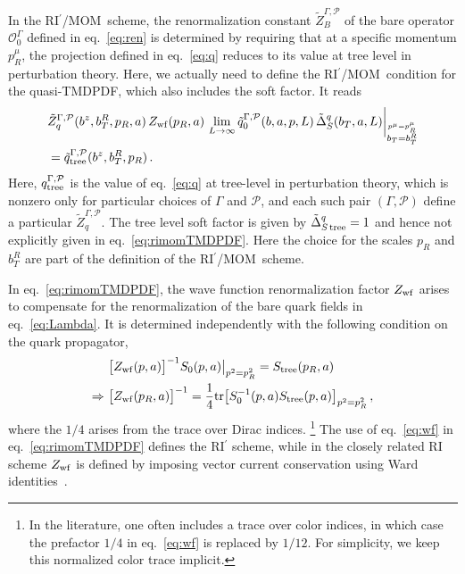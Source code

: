 \documentclass[11pt,a4paper]{article}
\DeclareRobustCommand{\eq}[1]{eq.~\eqref{eq:#1}}
\newcommand{\cO}{\mathcal{O}}
\newcommand{\cP}{\mathcal{P}}
\newcommand{\nn}{\nonumber}
\newcommand{\RIpMOM}{RI$^\prime$/MOM}
\begin{document}
In the \RIpMOM~scheme, the renormalization constant $\tilde Z_B^{\Gamma,\cP}$ of the
bare operator $\cO_0^\Gamma$ defined in \eq{ren} is determined by requiring that at
a specific momentum $p_R^\mu$, the projection defined in \eq{q} reduces to its value
at tree level in perturbation theory.
Here, we actually need to define the \RIpMOM\ condition for the quasi-TMDPDF, which also includes the soft factor. It reads
\begin{align}\label{eq:rimomTMDPDF}
 &\tilde Z^{\Gamma,\cP}_q(b^z, b_T^R, p_R, a) \, Z_{\rm wf}(p_R,a) \,
 \lim_{L\to\infty}  \tilde q^{\Gamma,\cP}_0(b, a, p, L) \, \tilde\Delta_S^q(b_T,a,L) \bigg|_{\stackrel{p^\mu = p_R^\mu}{b_T=b_T^R}}
\nn\\&
 = \tilde{q}^{\Gamma,\cP}_{\rm tree}(b^z,b_T^R,p_R)
\,.\end{align}
Here, $q^{\Gamma,\cP}_{\rm tree}$ is the value of \eq{q} at tree-level in perturbation theory,
which is nonzero only for particular choices of $\Gamma$ and $\cP$,
and each such pair $(\Gamma,\cP)$ define a particular $\tilde{Z}_q^{\Gamma,\cP}$.
The tree level soft factor is given by $\tilde \Delta_{S\,\rm tree}^q=1$ and hence not explicitly given in \eq{rimomTMDPDF}.
Here the choice for the scales $p_R$ and $b_T^R$ are part of the definition of the \RIpMOM\ scheme.


In \eq{rimomTMDPDF}, the wave function renormalization factor $Z_{\rm wf}$ arises to compensate
for the renormalization of the bare quark fields in \eq{Lambda}.
It is determined independently with the following condition on the quark propagator,
\begin{align}\label{eq:wf}
 & \bigl[Z_{\rm wf}(p,a)\bigr]^{-1} S_0(p,a)\big|_{p^2=p_R^2} = S_{\rm tree}(p_R,a)
\nn\\\Rightarrow~&
 \bigl[Z_{\rm wf}(p_R,a)\bigr]^{-1} = \frac14 {\rm tr}\bigl[S^{-1}_0(p,a)S_{\rm tree}(p,a)\bigr]_{p^2=p_R^2}
\,,\end{align}
where the $1/4$ arises from the trace over Dirac indices.%
\footnote{In the literature, one often includes a trace over color indices, in which case the prefactor $1/4$ in \eq{wf} is replaced by $1/12$. For simplicity, we keep this normalized color trace implicit.}
The use of \eq{wf} in \eq{rimomTMDPDF} defines the RI$^\prime$ scheme, while in the closely related RI scheme $Z_{\rm wf}$ is defined by imposing vector current conservation using Ward identities~\cite{Martinelli:1994ty}.
\end{document}
